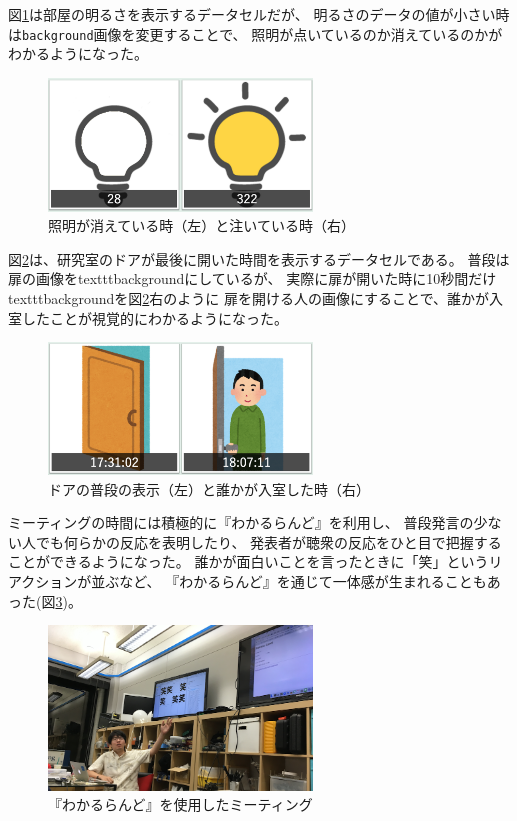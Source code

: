 図\ref{light}は部屋の明るさを表示するデータセルだが、
明るさのデータの値が小さい時は\texttt{background}画像を変更することで、
照明が点いているのか消えているのかがわかるようになった。

\begin{figure}[h]
\centering
\includegraphics[width=7cm]{images/light.png}
\caption{照明が消えている時（左）と注いている時（右）}
\label{light}
\end{figure}

図\ref{door}は、研究室のドアが最後に開いた時間を表示するデータセルである。
普段は扉の画像をtexttt{background}にしているが、
実際に扉が開いた時に10秒間だけtexttt{background}を図\ref{door}右のように
扉を開ける人の画像にすることで、誰かが入室したことが視覚的にわかるようになった。

\begin{figure}[h]
\centering
\includegraphics[width=7cm]{images/door.png}
\caption{ドアの普段の表示（左）と誰かが入室した時（右）}
\label{door}
\end{figure}

ミーティングの時間には積極的に『わかるらんど』を利用し、
普段発言の少ない人でも何らかの反応を表明したり、
発表者が聴衆の反応をひと目で把握することができるようになった。
誰かが面白いことを言ったときに「笑」というリアクションが並ぶなど、
『わかるらんど』を通じて一体感が生まれることもあった(図\ref{wara})。

\begin{figure}[h]
\centering
\includegraphics[width=7cm]{images/wara.png}
\caption{『わかるらんど』を使用したミーティング}
\label{wara}
\end{figure}